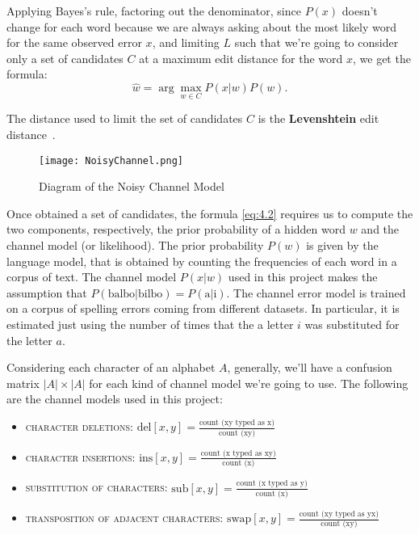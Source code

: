 Applying Bayes's rule, factoring out the denominator, since $P(x)$ doesn’t change for each word because we are always 
asking about the most likely word for the same observed error $x$,  and limiting $L$ such that we're going to consider 
only a set of candidates $C$ at a maximum edit distance for the word $x$, we get the formula:
\begin{equation}\label{eq:4.2}
\hat{w} = \arg\max_{w \in C} {P(x|w)P(w)} \mbox{.}
\end{equation}

The distance used to limit the set of candidates $C$ is the \textbf{Levenshtein} edit distance~\cite{martin2009speech}.	

\begin{figure}[H]
	\centering
	\texttt{[image: NoisyChannel.png]}
	\caption{Diagram of the Noisy Channel Model}
	\label{fig:noisychannel}
\end{figure}

Once obtained a set of candidates, the formula \ref{eq:4.2} requires us to compute the two components, 
respectively, the prior probability of a hidden word $w$ and the channel model (or likelihood).
The prior probability $P(w)$ is given by the language model, that is obtained by counting the frequencies of 
each word in a corpus of text.  
The channel model $P(x|w)$ used in this project makes the assumption that $P(\mbox{balbo}|\mbox{bilbo}) = 
P(\mbox{a}|\mbox{i})$. The channel error model is trained on a corpus of spelling errors coming from different 
datasets. In particular, it is estimated just using the number of times that the a letter $i$ was substituted for the 
letter $a$. 

Considering each character of an alphabet $A$, generally, we'll have a confusion matrix $|A|\times|A|$ for each 
kind of channel model we're going to use. The following are the channel models used in this project:
\begin{itemize}
	\item \textsc{character deletions}: $\mbox{del}[x, y] = \frac{\mbox{count (xy  typed as x)}} 
	{\mbox{count (xy)}}$
	\item \textsc{character insertions}: $\mbox{ins}[x, y] = \frac{\mbox{count (x  typed as xy)}} 
	{\mbox{count (x)}}$
	\item \textsc{substitution of characters}: $\mbox{sub}[x, y] = \frac{\mbox{count (x  typed as y)}} 
	{\mbox{count (x)}}$
	\item \textsc{transposition of adjacent characters}: $\mbox{swap}[x, y] = \frac{\mbox{count (xy  typed as 
	yx)}} 
	{\mbox{count (xy)}}$
\end{itemize}


